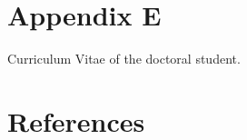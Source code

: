 \documentclass[12pt,twoside]{reedthesis}
\begin{document}
\begin{acknowledgements}
  \end{acknowledgements}

  \hypersetup{linkcolor=black}
  \setcounter{secnumdepth}{4}
  \setcounter{tocdepth}{4}
  \tableofcontents

  \listoftables

  \listoffigures



\mainmatter %
\pagestyle{fancyplain} %

\hypertarget{ae}{%
\chapter*{Appendix E}\label{ae}}

Curriculum Vitae of the doctoral student.

\setcounter{secnumdepth}{-1}


\backmatter

\hypertarget{references}{%
\chapter*{References}\label{references}}


\noindent

\setlength{\parindent}{-0.20in}


\end{document}
